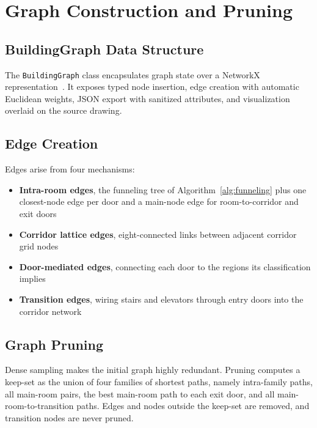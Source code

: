 \documentclass[manuscript,screen,review]{acmart}
\begin{document}
\section{Graph Construction and Pruning}
\label{sec:graph}

\subsection{BuildingGraph Data Structure}
\label{subsec:buildinggraph}

The \texttt{BuildingGraph} class encapsulates graph state over a NetworkX representation~\cite{networkx}. It exposes typed node insertion, edge creation with automatic Euclidean weights, JSON export with sanitized attributes, and visualization overlaid on the source drawing.

\subsection{Edge Creation}
\label{subsec:edges}

Edges arise from four mechanisms:

\begin{itemize}
    \item \textbf{Intra-room edges}, the funneling tree of Algorithm~\ref{alg:funneling} plus one closest-node edge per door and a main-node edge for room-to-corridor and exit doors
    \item \textbf{Corridor lattice edges}, eight-connected links between adjacent corridor grid nodes
    \item \textbf{Door-mediated edges}, connecting each door to the regions its classification implies
    \item \textbf{Transition edges}, wiring stairs and elevators through entry doors into the corridor network
\end{itemize}

\subsection{Graph Pruning}
\label{subsec:pruning}

Dense sampling makes the initial graph highly redundant. Pruning computes a keep-set as the union of four families of shortest paths, namely intra-family paths, all main-room pairs, the best main-room path to each exit door, and all main-room-to-transition paths. Edges and nodes outside the keep-set are removed, and transition nodes are never pruned. 
\end{document}
